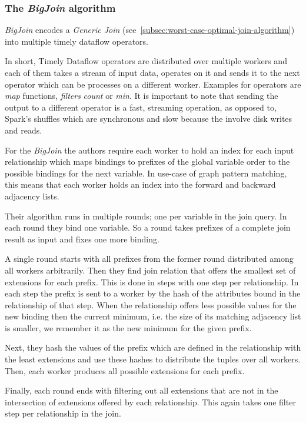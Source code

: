 \subsubsection{The \textit{BigJoin} algorithm}
\textit{BigJoin} encodes a \textit{Generic Join} (see~\cref{subsec:worst-case-optimal-join-algorithm}) into multiple
timely dataflow operators.

In short, Timely Dataflow operators are distributed over multiple workers and each of them takes a stream of input data, operates
on it and sends it to the next operator which can be processes on a different worker.
Examples for operators are \textit{map} functions, \textit{filters} \textit{count} or \textit{min}.
It is important to note that sending the output to a different operator is a fast, streaming operation, as opposed to,
Spark's shuffles which are synchronous and slow because the involve disk writes and reads.

For the \textit{BigJoin} the authors require each worker to hold an index for each input relationship which maps bindings to prefixes
of the global variable order to the possible bindings for the next variable.
In use-case of graph pattern matching, this means that each worker holds an index into the forward and backward adjacency lists.

Their algorithm runs in multiple rounds;
one per variable in the join query.
In each round they bind one variable.
So a round takes prefixes of a complete join result as input and fixes one more binding.

A single round starts with all prefixes from the former round distributed among all workers arbitrarily.
Then they find join relation that offers the smallest set of extensions for each prefix.
This is done in steps with one step per relationship.
In each step the prefix is sent to a worker by the hash of the attributes bound in the relationship of that step.
When the relationship offers less possible values for the new binding then the current minimum, i.e. the size of its matching adjacency
list is smaller, we remember it as the new minimum for the given prefix.

Next, they hash the values of the prefix which are defined in the relationship with the least extensions and use these hashes to
distribute the tuples over all workers.
Then, each worker produces all possible extensions for each prefix.

Finally, each round ends with filtering out all extensions that are not in the intersection of extensions offered by each relationship.
This again takes one filter step per relationship in the join.

